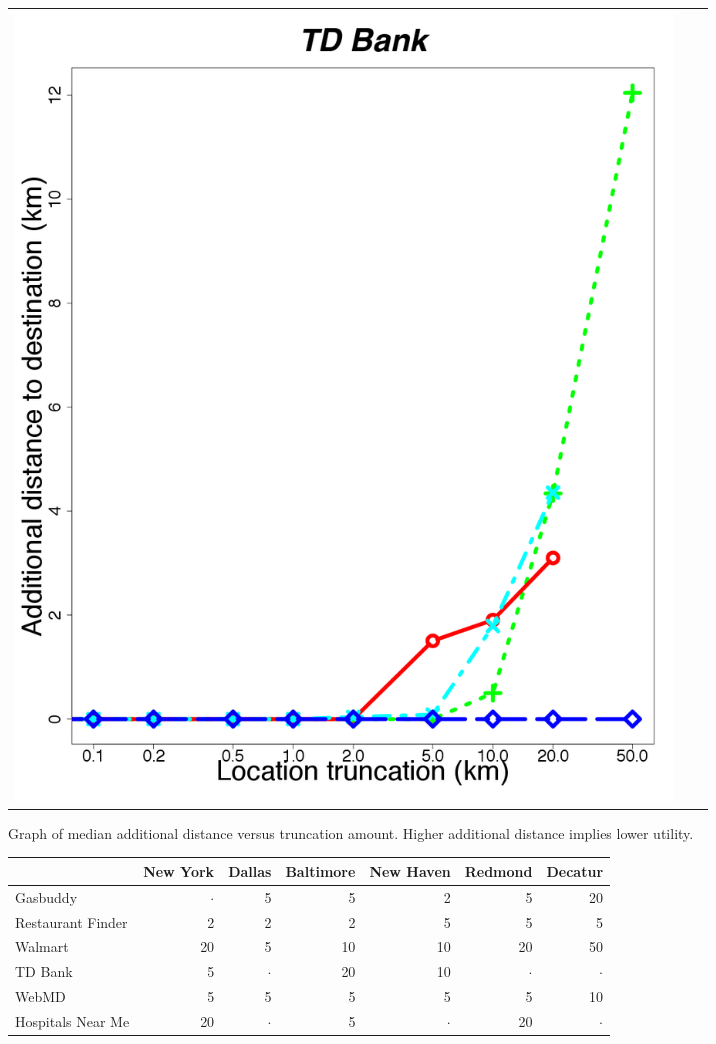 \documentclass[10pt, conference, compsocconf]{IEEEtran}
\begin{document}
{\begin{figure}
\begin{subfigure}{\textwidth}
\begin{tabular}{ccc}
    \begin{minipage}{2in}
      \includegraphics[width=\textwidth]
                      {data/tdbank/plots/medians_across_city_additional_distance}
    \end{minipage}
  \end{tabular}
  \caption{Graph of median additional distance versus
    truncation amount.  Higher additional distance implies lower
    utility.}
  \label{fig:add_distance}
  \end{subfigure}

  \bigskip{}

  \begin{subfigure}{\textwidth}
 \small
 \centering
 \begin{tabular}{|l||r|r|r|r|r|r|}
 \hline
 & New York & Dallas & Baltimore & New Haven & Redmond & Decatur \\
 \hline
 \hline
 Gasbuddy & $\cdot$ & 5 & 5 & 2 & 5 & 20 \\
\hline
Restaurant Finder & 2 & 2 & 2 & 5 & 5 & 5 \\
\hline
Walmart & 20 & 5 & 10 & 10 & 20 & 50 \\
\hline
TD Bank & 5 & $\cdot$ & 20 & 10 & $\cdot$ & $\cdot$ \\
\hline
WebMD & 5 & 5 & 5 & 5 & 5 & 10 \\
\hline
Hospitals Near Me & 20 & $\cdot$ & 5 & $\cdot$ & 20 & $\cdot$ \\
\hline


\end{tabular}
\end{subfigure}
\end{figure}}
\end{document}
